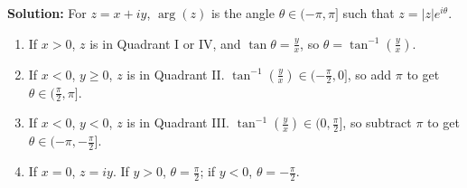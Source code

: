 \textbf{Solution:}
For \( z = x + iy \), \( \arg(z) \) is the angle \( \theta \in (-\pi, \pi] \) such that \( z = |z| e^{i\theta} \).
\begin{enumerate}[label=\alph*)]
\item If \( x > 0 \), \( z \) is in Quadrant I or IV, and \( \tan \theta = \frac{y}{x} \), so \( \theta = \tan^{-1}\left( \frac{y}{x} \right) \).
\item If \( x < 0 \), \( y \geq 0 \), \( z \) is in Quadrant II. \( \tan^{-1}\left( \frac{y}{x} \right) \in (-\frac{\pi}{2}, 0] \), so add \( \pi \) to get \( \theta \in (\frac{\pi}{2}, \pi] \).
\item If \( x < 0 \), \( y < 0 \), \( z \) is in Quadrant III. \( \tan^{-1}\left( \frac{y}{x} \right) \in (0, \frac{\pi}{2}] \), so subtract \( \pi \) to get \( \theta \in (-\pi, -\frac{\pi}{2}] \).
\item If \( x = 0 \), \( z = iy \). If \( y > 0 \), \( \theta = \frac{\pi}{2} \); if \( y < 0 \), \( \theta = -\frac{\pi}{2} \).
\end{enumerate}



